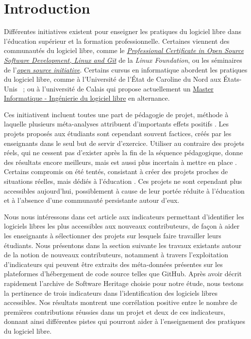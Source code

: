 \documentclass[dvipsnames,runningheads]{llncs}
\newcommand{\en}[1]{\foreignlanguage{english}{\emph{#1}}}
\begin{document}

    \section{Introduction}

    Différentes initiatives existent pour enseigner les pratiques du logiciel libre dans l'éducation supérieur
    et la formation professionnelle. Certaines viennent des communautés du logiciel libre, comme le
    \href{https://www.edx.org/professional-certificate/linuxfoundationx-open-source-software-development-linux-and-git}{\en{Professional
    Certificate in Open Source Software Development, Linux and Git}} de la \en{Linux Foundation}, ou les
    séminaires de l'\href{https://opensource.org/osi-open-source-education}{\en{open source initiative}}.
    Certains cursus en informatique abordent les pratiques du logiciel libre, comme à l'Université de l'État
    de Caroline du Nord aux États-Unis \parencite{oss-edu-2008} ; ou à l'université de Calais qui propose
    actuellement un
    \href{https://www.univ-littoral.fr/formation/offre-de-formation/masters/master-informatique-ingenierie-du-logiciel-libre/}{Master
    Informatique - Ingénierie du logiciel libre} en alternance.

    Ces initiativent incluent toutes une part de pédagogie de projet, méthode à laquelle plusieurs
    méta-analyses attribuent d'importants effets positifs \cite{pbl-2019, pbl-2018}. Les projets proposés aux
    étudiants sont cependant souvent factices, créés par les enseignants dans le seul but de servir
    d'exercice. Utiliser au contraire des projets réels, qui ne cessent pas d'exister après la fin de la
    séquence pédagogique, donne des résultats encore meilleurs, mais est aussi plus incertain à mettre en
    place \cite{real-pbl-2010, real-pbl-2004}. Certains compromis on été tentés, consistant à créer des
    projets proches de situations réelles, mais dédiés à l'éducation \cite{oss-edu-2008}. Ces projets ne sont
    cependant plus accessibles aujourd'hui, possiblement à cause de leur portée réduite à l'éducation et à
    l'absence d'une communauté persistante autour d'eux.

    Nous nous intéressons dans cet article aux indicateurs permettant d'identifier les logiciels libres les
    plus accessibles aux nouveaux contributeurs, de façon à aider les enseignants à sélectionner des projets
    sur lesquels faire travailler leurs étudiants. Nous présentons dans la section suivante les travaux
    existants autour de la notion de nouveaux contributeurs, notamment à travers l'exploitation d'indicateurs
    qui peuvent être extraits des méta-données présentes sur les plateformes d'hébergement de code source
    telles que GitHub. Après avoir décrit rapidement l'archive de Software Heritage choisie pour notre étude,
    nous testons la pertinence de trois indicateurs dans l'identification des logiciels libres accessibles.
    Nos résultats montrent une corrélation positive entre le nombre de premières contributions réussies dans
    un projet et deux de ces indicateurs, donnant ainsi différentes pistes qui pourront aider à l’enseignement
    des pratiques du logiciel libre.
\end{document}
